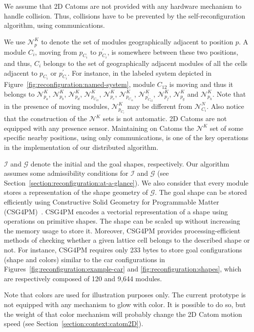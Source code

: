 We assume that 2D Catoms are not provided with any hardware mechanism to handle collision. Thus, collisions have to be prevented by the self-reconfiguration algorithm, using communications. 

We use $\mathcal{N}^{K}_{p}$ to denote the set of modules geographically adjacent to position $p$.  A module ${C_i}$, moving from $p_{C_i}$ to $p^{\prime}_{C_i}$, is somewhere between these two positions, and thus, ${C_i}$ belongs to the set of geographically adjacent modules of all the cells adjacent to $p_{C_i}$ or $p^{\prime}_{C_i}$. For instance, in the labeled system depicted in Figure~\ref{fig:reconfiguration:named-system}, module $C_{12}$ is moving and thus it belongs to $\mathcal{N}^{K}_{p_a}$, $\mathcal{N}^{K}_{p_b}$, $\mathcal{N}^{K}_{p_d}$, $\mathcal{N}^{K}_{p_{C_{12}}}$, $\mathcal{N}^{K}_{p_e}$, $\mathcal{N}^{K}_{p_{C_{11}}}$, $\mathcal{N}^{K}_{p^{\prime}_{C_{12}}}$, $\mathcal{N}^{K}_{p_f}$, $\mathcal{N}^{K}_{p_g}$ and $\mathcal{N}^{K}_{p_h}$. Note that in the presence of moving modules, $\mathcal{N}^{K}_{p_{C_{i}}}$ may be different from $\mathcal{N}^{N}_{C_{i}}$. Also notice that the construction of the $\mathcal{N}^{K}$ sets is not automatic. 2D Catoms are not equipped with any presence sensor. Maintaining on Catoms the $\mathcal{N}^{K}$ set of some specific nearby positions, using only communications, is one of the key operations in the implementation of our distributed algorithm.

$\mathcal{I}$ and $\mathcal{G}$ denote the initial and the goal shapes, respectively. Our algorithm assumes some admissibility conditions for $\mathcal{I}$ and $\mathcal{G}$ (see Section~\ref{section:reconfiguration:at-a-glance}). We also consider that every module stores a representation of the shape geometry of $\mathcal{G}$. The goal shape can be stored efficiently using Constructive Solid Geometry for Programmable Matter (CSG4PM)~\cite{tucci2017efficient}. CSG4PM encodes a vectorial representation of a shape using operations on primitive shapes. The shape can be scaled up without increasing the memory usage to store it. Moreover, CSG4PM provides processing-efficient methods of checking whether a given lattice cell belongs to the described shape or not. For instance, CSG4PM requires only 233 bytes to store goal configurations (shape and colors) similar to the car configurations in Figures~\ref{fig:reconfiguration:example-car} and \ref{fig:reconfiguration:shapes}, which are respectively composed of 120 and 9,644 modules.

Note that colors are used for illustration purposes only. The current prototype is not equipped with any mechanism to glow with color. It is possible to do so, but the weight of that color mechanism will probably change the 2D Catom motion speed (see Section~\ref{section:context:catom2D}).

